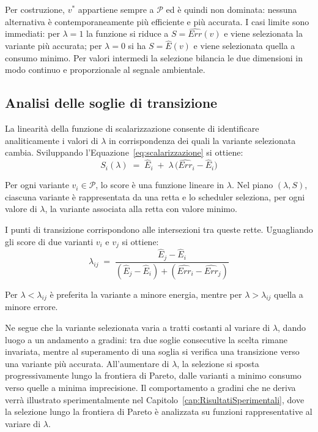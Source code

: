 Per costruzione, $v^*$ appartiene sempre a $\mathcal{P}$ ed è quindi
non dominata: nessuna alternativa è contemporaneamente più efficiente
e più accurata. I casi limite sono immediati: per $\lambda = 1$ la
funzione si riduce a $S = \widehat{\mathit{Err}}(v)$ e viene
selezionata la variante più accurata; per $\lambda = 0$ si ha
$S = \hat{E}(v)$ e viene selezionata quella a consumo minimo. Per
valori intermedi la selezione bilancia le due dimensioni in modo
continuo e proporzionale al segnale ambientale.

\subsection{Analisi delle soglie di transizione}
\label{sec:scalarizzazione:soglie}

La linearità della funzione di scalarizzazione consente di
identificare analiticamente i valori di $\lambda$ in corrispondenza
dei quali la variante selezionata cambia. Sviluppando
l'Equazione~\eqref{eq:scalarizzazione} si ottiene:
%
\begin{equation}
    S_i(\lambda) \;=\; \hat{E}_i \;+\;
        \lambda\,\bigl(\widehat{\mathit{Err}}_i - \hat{E}_i\bigr)
    \label{eq:score_lineare}
\end{equation}

Per ogni variante $v_i \in \mathcal{P}$, lo score è una funzione
lineare in $\lambda$. Nel piano $(\lambda, S)$, ciascuna variante è
rappresentata da una retta e lo scheduler seleziona, per ogni valore
di $\lambda$, la variante associata alla retta con valore minimo.

I punti di transizione corrispondono alle intersezioni tra queste
rette. Uguagliando gli score di due varianti $v_i$ e $v_j$ si ottiene:
%
\begin{equation}
    \lambda_{ij} \;=\;
        \frac{\hat{E}_j - \hat{E}_i}
             {(\hat{E}_j - \hat{E}_i) +
              (\widehat{\mathit{Err}}_i - \widehat{\mathit{Err}}_j)}
    \label{eq:soglia}
\end{equation}

Per $\lambda < \lambda_{ij}$ è preferita la variante a minore energia,
mentre per $\lambda > \lambda_{ij}$ quella a minore errore.

Ne segue che la variante selezionata varia a tratti costanti al variare
di $\lambda$, dando luogo a un andamento a gradini: tra due soglie
consecutive la scelta rimane invariata, mentre al superamento di una
soglia si verifica una transizione verso una variante più accurata.
All'aumentare di $\lambda$, la selezione si sposta progressivamente
lungo la frontiera di Pareto, dalle varianti a minimo consumo verso
quelle a minima imprecisione.
Il comportamento a gradini che ne deriva verrà illustrato 
sperimentalmente nel Capitolo~\ref{cap:RisultatiSperimentali}, 
dove la selezione lungo la frontiera di Pareto è analizzata 
su funzioni rappresentative al variare di $\lambda$.


